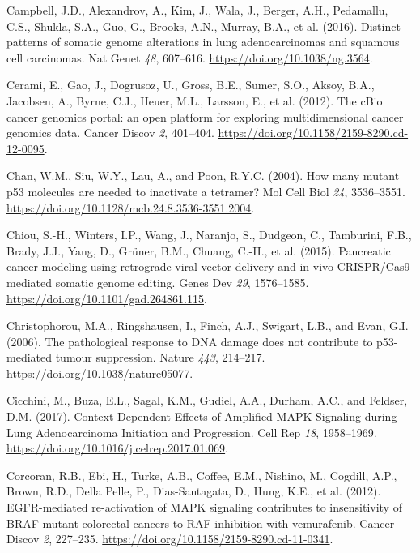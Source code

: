 \begin{CSLReferences}{0}{0}
\leavevmode{}%
Campbell, J.D., Alexandrov, A., Kim, J., Wala, J., Berger, A.H., Pedamallu, C.S., Shukla, S.A., Guo, G., Brooks, A.N., Murray, B.A., et al. (2016). Distinct patterns of somatic genome alterations in lung adenocarcinomas and squamous cell carcinomas. Nat Genet \emph{48}, 607--616. \url{https://doi.org/10.1038/ng.3564}.

\leavevmode{}%
Cerami, E., Gao, J., Dogrusoz, U., Gross, B.E., Sumer, S.O., Aksoy, B.A., Jacobsen, A., Byrne, C.J., Heuer, M.L., Larsson, E., et al. (2012). The cBio cancer genomics portal: an open platform for exploring multidimensional cancer genomics data. Cancer Discov \emph{2}, 401--404. \url{https://doi.org/10.1158/2159-8290.cd-12-0095}.

\leavevmode{}%
Chan, W.M., Siu, W.Y., Lau, A., and Poon, R.Y.C. (2004). How many mutant p53 molecules are needed to inactivate a tetramer? Mol Cell Biol \emph{24}, 3536--3551. \url{https://doi.org/10.1128/mcb.24.8.3536-3551.2004}.

\leavevmode{}%
Chiou, S.-H., Winters, I.P., Wang, J., Naranjo, S., Dudgeon, C., Tamburini, F.B., Brady, J.J., Yang, D., Grüner, B.M., Chuang, C.-H., et al. (2015). Pancreatic cancer modeling using retrograde viral vector delivery and in vivo CRISPR/Cas9-mediated somatic genome editing. Genes Dev \emph{29}, 1576--1585. \url{https://doi.org/10.1101/gad.264861.115}.

\leavevmode{}%
Christophorou, M.A., Ringshausen, I., Finch, A.J., Swigart, L.B., and Evan, G.I. (2006). The pathological response to DNA damage does not contribute to p53-mediated tumour suppression. Nature \emph{443}, 214--217. \url{https://doi.org/10.1038/nature05077}.

\leavevmode{}%
Cicchini, M., Buza, E.L., Sagal, K.M., Gudiel, A.A., Durham, A.C., and Feldser, D.M. (2017). Context-Dependent Effects of Amplified MAPK Signaling during Lung Adenocarcinoma Initiation and Progression. Cell Rep \emph{18}, 1958--1969. \url{https://doi.org/10.1016/j.celrep.2017.01.069}.

\leavevmode{}%
Corcoran, R.B., Ebi, H., Turke, A.B., Coffee, E.M., Nishino, M., Cogdill, A.P., Brown, R.D., Della Pelle, P., Dias-Santagata, D., Hung, K.E., et al. (2012). EGFR-mediated re-activation of MAPK signaling contributes to insensitivity of BRAF mutant colorectal cancers to RAF inhibition with vemurafenib. Cancer Discov \emph{2}, 227--235. \url{https://doi.org/10.1158/2159-8290.cd-11-0341}.


\end{CSLReferences}
